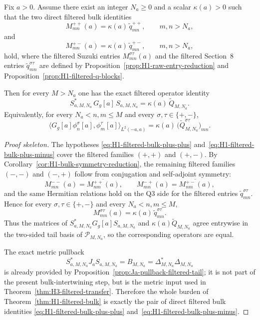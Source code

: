 \begin{theorem}\label{thm:H1-filtered-bulk}
Fix $a>0$. Assume there exist an integer $N_a\ge 0$ and a scalar
$\kappa(a)>0$ such that the two direct filtered bulk identities
\begin{equation}\label{eq:H1-filtered-bulk-plus-plus}
  M_{mn}^{++}(a)=\kappa(a)\,\widetilde q_{mn}^{++},
  \qquad m,n>N_a,
\end{equation}
and
\begin{equation}\label{eq:H1-filtered-bulk-plus-minus}
  M_{mn}^{+-}(a)=\kappa(a)\,\widetilde q_{mn}^{+-},
  \qquad m,n>N_a,
\end{equation}
hold, where the filtered Suzuki entries $M_{mn}^{\sigma\tau}(a)$ and the
filtered Section~8 entries $\widetilde q_{mn}^{\sigma\tau}$ are defined by
Proposition~\ref{prop:H1-raw-entry-reduction} and
Proposition~\ref{prop:H1-filtered-q-blocks}.

Then for every $M>N_a$ one has the exact filtered operator identity
\[
  S_{a,M,N_a}^*\,G_g[a]\,S_{a,M,N_a}
  =
  \kappa(a)\,\widetilde Q_{M,N_a}.
\]
Equivalently, for every $N_a<n,m\le M$ and every $\sigma,\tau\in\{+,-\}$,
\[
  \bigl\langle G_g[a]\phi_n^\sigma[a],\phi_m^\tau[a]\bigr\rangle_{L^2(-a,a)}
  =
  \kappa(a)\,\bigl(\widetilde Q_{M,N_a}^{\sigma\tau}\bigr)_{mn}.
\]
\end{theorem}

\begin{proof}[Proof skeleton]
The hypotheses \eqref{eq:H1-filtered-bulk-plus-plus}
and~\eqref{eq:H1-filtered-bulk-plus-minus} cover the filtered families
$(+,+)$ and $(+,-)$. By Corollary~\ref{cor:H1-bulk-symmetry-reduction}, the
remaining filtered families $(-,-)$ and $(-,+)$ follow from conjugation and
self-adjoint symmetry:
\[
  M_{mn}^{--}(a)=\overline{M_{nm}^{++}(a)},
  \qquad
  M_{mn}^{-+}(a)=\overline{M_{nm}^{+-}(a)},
\]
and the same Hermitian relations hold on the Q3 side for the filtered entries
$\widetilde q_{mn}^{\sigma\tau}$.
Hence for every $\sigma,\tau\in\{+,-\}$ and every $N_a<n,m\le M$,
\[
  M_{mn}^{\sigma\tau}(a)=\kappa(a)\,\widetilde q_{mn}^{\sigma\tau}.
\]
Thus the matrices of $S_{a,M,N_a}^*G_g[a]S_{a,M,N_a}$ and
$\kappa(a)\widetilde Q_{M,N_a}$ agree entrywise in the two-sided tail basis of
$\mathcal P_{M,N_a}$, so the corresponding operators are equal.

The exact metric pullback
\[
  S_{a,M,N_a}^*J_aS_{a,M,N_a}=B_{M,N_a}=\Delta_{M,N_a}^*\Delta_{M,N_a}
\]
is already provided by Proposition~\ref{prop:Ja-pullback-filtered-tail}; it is
not part of the present bulk-intertwining step, but is the metric input used in
Theorem~\ref{thm:H3-filtered-transfer}. Therefore the whole burden of
Theorem~\ref{thm:H1-filtered-bulk} is exactly the pair of direct filtered bulk
identities \eqref{eq:H1-filtered-bulk-plus-plus}
and~\eqref{eq:H1-filtered-bulk-plus-minus}.
\end{proof}

